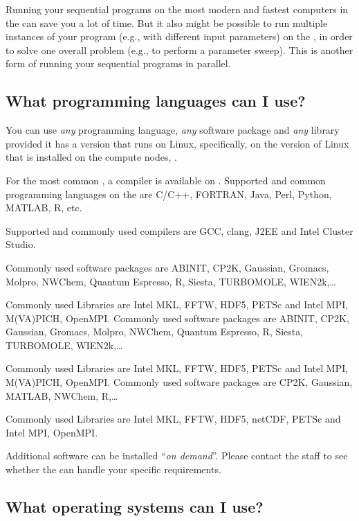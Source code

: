 Running your sequential programs on the most modern and fastest computers in
the \hpc can save you a lot of time.  But it also might be possible to run
multiple instances of your program (e.g., with different input parameters) on
the \hpc, in order to solve one overall problem (e.g., to perform a parameter
sweep). This is another form of running your sequential programs in parallel.

\subsection{What programming languages can I use?}
\label{sec:what-programming-languages-can-i-use}

You can use \emph{any} programming language, \emph{any} software package and
\emph{any} library provided it has a version that runs on Linux, specifically,
on the version of Linux that is installed on the compute nodes,
\operatingsystembase.

For the most common , a compiler is available on
\operatingsystem. Supported and common programming languages on the \hpc are
C/C++, FORTRAN, Java, Perl, Python, MATLAB, R, etc.

Supported and commonly used compilers are GCC, clang, J2EE and Intel Cluster
Studio.


\ifantwerpen
Commonly used software packages are ABINIT, CP2K, Gaussian, Gromacs, Molpro,
NWChem, Quantum Espresso, R, Siesta, TURBOMOLE, WIEN2k,\ldots

Commonly used Libraries are Intel MKL, FFTW, HDF5, PETSc and Intel MPI,
M(VA)PICH, OpenMPI.
\fi
\ifleuven
Commonly used software packages are ABINIT, CP2K, Gaussian, Gromacs, Molpro,
NWChem, Quantum Espresso, R, Siesta, TURBOMOLE, WIEN2k,\ldots

Commonly used Libraries are Intel MKL, FFTW, HDF5, PETSc and Intel MPI,
M(VA)PICH, OpenMPI.
\fi
\ifbrussel
Commonly used software packages are CP2K, Gaussian, MATLAB, NWChem, R,\ldots

Commonly used Libraries are Intel MKL, FFTW, HDF5, netCDF, PETSc and Intel MPI,
OpenMPI.
\fi

Additional software can be installed ``\emph{on demand}''. Please contact the
\hpc staff to see whether the \hpc can handle your specific requirements.

\subsection{What operating systems can I use?}
\label{sec:what-operating-systems-can-i-use}

